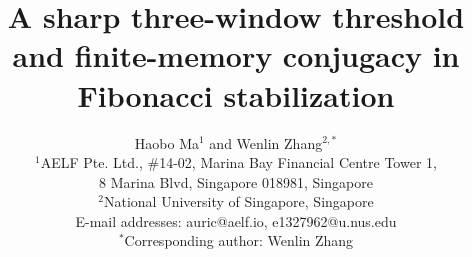 \documentclass[12pt,a4paper]{article}
\title{A sharp three-window threshold and finite-memory conjugacy in Fibonacci stabilization}
\author{Haobo Ma$^{1}$ and Wenlin Zhang$^{2,*}$\\[4pt]
{\small $^1$AELF Pte. Ltd., \#14-02, Marina Bay Financial Centre Tower 1,}\\
{\small 8 Marina Blvd, Singapore 018981, Singapore}\\
{\small $^2$National University of Singapore, Singapore}\\[2pt]
{\small E-mail addresses: auric@aelf.io, e1327962@u.nus.edu}\\
{\small $^*$Corresponding author: Wenlin Zhang}}
\date{}
\theoremstyle{definition}
\theoremstyle{plain}
\theoremstyle{remark}
\numberwithin{equation}{section}
\begin{document}
\linenumbers
\maketitle










\appendix









\end{document}
